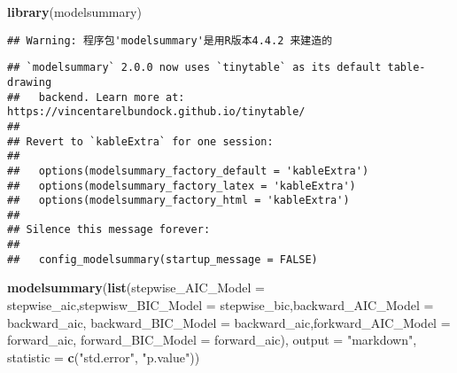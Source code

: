 \documentclass[
]{article}
\newenvironment{Shaded}{\begin{snugshade}}{\end{snugshade}}
\newcommand{\AttributeTok}[1]{\textcolor[rgb]{0.13,0.29,0.53}{#1}}
\newcommand{\FunctionTok}[1]{\textcolor[rgb]{0.13,0.29,0.53}{\textbf{#1}}}
\newcommand{\NormalTok}[1]{#1}
\newcommand{\StringTok}[1]{\textcolor[rgb]{0.31,0.60,0.02}{#1}}
\begin{document}
\begin{Shaded}
\begin{Highlighting}[]
\FunctionTok{library}\NormalTok{(modelsummary)}
\end{Highlighting}
\end{Shaded}

\begin{verbatim}
## Warning: 程序包'modelsummary'是用R版本4.4.2 来建造的
\end{verbatim}

\begin{verbatim}
## `modelsummary` 2.0.0 now uses `tinytable` as its default table-drawing
##   backend. Learn more at: https://vincentarelbundock.github.io/tinytable/
## 
## Revert to `kableExtra` for one session:
## 
##   options(modelsummary_factory_default = 'kableExtra')
##   options(modelsummary_factory_latex = 'kableExtra')
##   options(modelsummary_factory_html = 'kableExtra')
## 
## Silence this message forever:
## 
##   config_modelsummary(startup_message = FALSE)
\end{verbatim}

\begin{Shaded}
\begin{Highlighting}[]
\FunctionTok{modelsummary}\NormalTok{(}\FunctionTok{list}\NormalTok{(}\AttributeTok{stepwise\_AIC\_Model =}\NormalTok{ stepwise\_aic,}\AttributeTok{stepwisw\_BIC\_Model =}\NormalTok{ stepwise\_bic,}\AttributeTok{backward\_AIC\_Model =}\NormalTok{ backward\_aic, }\AttributeTok{backward\_BIC\_Model =}\NormalTok{ backward\_aic,}\AttributeTok{forkward\_AIC\_Model =}\NormalTok{ forward\_aic, }\AttributeTok{forward\_BIC\_Model =}\NormalTok{ forward\_aic), }
             \AttributeTok{output =} \StringTok{"markdown"}\NormalTok{, }
             \AttributeTok{statistic =} \FunctionTok{c}\NormalTok{(}\StringTok{"std.error"}\NormalTok{, }\StringTok{"p.value"}\NormalTok{))}
\end{Highlighting}
\end{Shaded}
\end{document}
